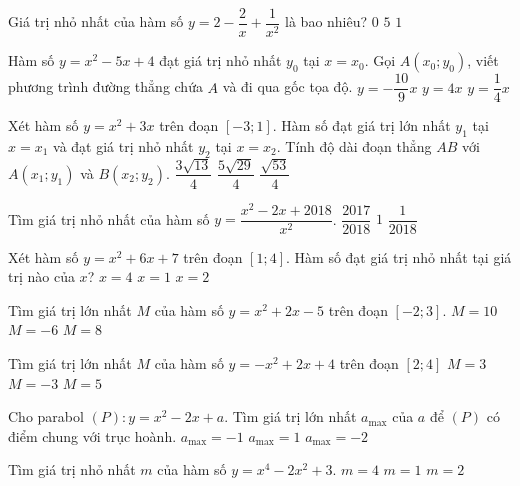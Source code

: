 \begin{ex}%
	Giá trị nhỏ nhất của hàm số $y=2-\dfrac{2}{x}+\dfrac{1}{x^2}$ là bao nhiêu?
	{$0$}
	{$5$}
	{\True $1$}
\end{ex}
\begin{ex}%
	Hàm số $y=x^2-5x+4$ đạt giá trị nhỏ nhất $y_0$ tại $x=x_0$. Gọi $A(x_0;y_0)$, viết phương trình đường thẳng chứa $A$ và đi qua gốc tọa độ.
	{$y=-\dfrac{10}{9}x$}
	{$y=4x$}
	{$y=\dfrac{1}{4}x$}
\end{ex}
\begin{ex}%
	Xét hàm số $y=x^2+3x$ trên đoạn $\left[-3;1\right]$. Hàm số đạt giá trị lớn nhất $y_1$ tại $x=x_1$ và đạt giá trị nhỏ nhất $y_2$ tại $x=x_2$. Tính độ dài đoạn thẳng $AB$ với $A\left(x_1;y_1\right)$ và $B\left(x_2;y_2\right)$.
	{$\dfrac{3\sqrt{13}}{4}$}
	{\True $\dfrac{5\sqrt{29}}{4}$}
	{$\dfrac{\sqrt{53}}{4}$}
\end{ex}
\begin{ex}%
	Tìm giá trị nhỏ nhất của hàm số $y=\dfrac{x^2-2x+2018}{x^2}$.
	{\True $\dfrac{2017}{2018}$}
	{$1$}
	{$\dfrac{1}{2018}$}
\end{ex}
\begin{ex}%
	Xét hàm số $y=x^2+6x+7$ trên đoạn $\left[1;4\right]$. Hàm số đạt giá trị nhỏ nhất tại giá trị nào của $x$?
	{$x=4$}
	{\True $x=1$}
	{$x=2$}
\end{ex}

\begin{ex}%
	Tìm giá trị lớn nhất $M$ của hàm số $y=x^2+2x-5$ trên đoạn $[-2; 3]$.
	{\True $M=10$}
	{$M=-6$}
	{$M=8$}
\end{ex}

\begin{ex}%
	Tìm giá trị lớn nhất $M$ của hàm số $y=-x^2+2x+4$ trên đoạn $[2;4]$
	{$M =3$}
	{$M=-3$}
	{$M=5$}
\end{ex}

\begin{ex}%
	Cho parabol $(P): y=x^2-2x+a$. Tìm giá trị lớn nhất $a_{\max}$ của $a$ để $(P)$ có điểm chung với trục hoành.
	{$a_{\max}=-1$}
	{\True $a_{\max}=1$}
	{$a_{\max}=-2$}
\end{ex}

\begin{ex}%
	Tìm giá trị nhỏ nhất $m$ của hàm số $y=x^4-2x^2+3$.
	{$m=4$}
	{$m=1$}
	{\True $m=2$}
\end{ex}

